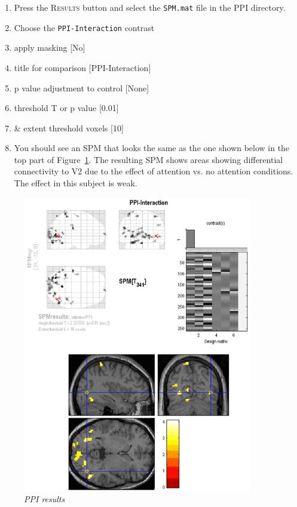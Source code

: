 \begin{enumerate}
\item Press the \textsc{Results} button and select the \texttt{SPM.mat} file in the PPI directory.
\item Choose the \texttt{PPI-Interaction} contrast
\item apply masking [No]
\item title for comparison [PPI-Interaction]
\item p value adjustment to control [None]
\item threshold {T or p value} [0.01]
\item \& extent threshold {voxels} [10]
\item You should see an SPM that looks the same as the one shown below in the top part of Figure~\ref{fig:ppi15}. The resulting SPM shows areas showing differential connectivity to V2 due to the effect of attention vs. no attention conditions. The effect in this subject is weak.
\end{enumerate}

\begin{figure}[!ht]
\centering\includegraphics[width=100mm]{ppi/figures/Fig15.png}
\caption{\em PPI results}
\label{fig:ppi15}
\end{figure}

